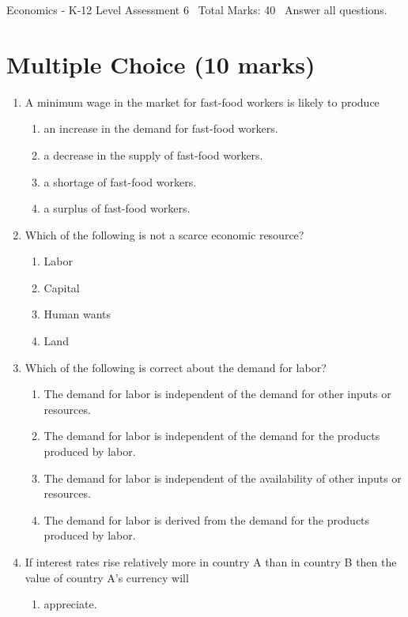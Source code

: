 \documentclass[12pt]{article}
\begin{document}
\begin{center}
Economics - K-12 Level Assessment 6 \
Total Marks: 40 \
Answer all questions.
\end{center}

\section*{Multiple Choice (10 marks)}
\begin{enumerate}[label=\arabic*.]
\item A minimum wage in the market for fast-food workers is likely to produce
\begin{enumerate}[label=(\alph*)]
    \item an increase in the demand for fast-food workers.
    \item a decrease in the supply of fast-food workers.
    \item a shortage of fast-food workers.
    \item a surplus of fast-food workers.
\end{enumerate}
\item Which of the following is not a scarce economic resource?
\begin{enumerate}[label=(\alph*)]
    \item Labor
    \item Capital
    \item Human wants
    \item Land
\end{enumerate}
\item Which of the following is correct about the demand for labor?
\begin{enumerate}[label=(\alph*)]
    \item The demand for labor is independent of the demand for other inputs or resources.
    \item The demand for labor is independent of the demand for the products produced by labor.
    \item The demand for labor is independent of the availability of other inputs or resources.
    \item The demand for labor is derived from the demand for the products produced by labor.
\end{enumerate}
\item If interest rates rise relatively more in country A than in country B then the value of country A's currency will
\begin{enumerate}[label=(\alph*)]
    \item appreciate.

\end{enumerate}
\end{enumerate}
\end{document}
